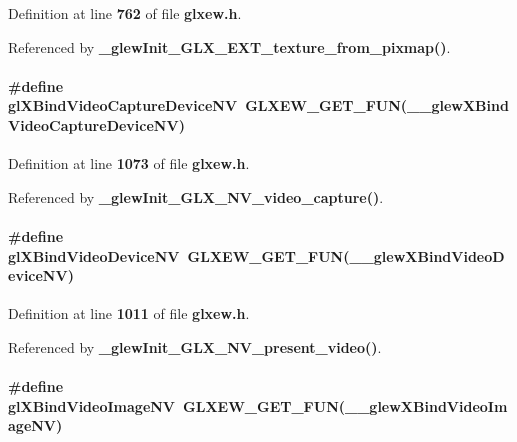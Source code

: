 Definition at line {\bf 762} of file {\bf glxew.\+h}.



Referenced by {\bf \+\_\+glew\+Init\+\_\+\+G\+L\+X\+\_\+\+E\+X\+T\+\_\+texture\+\_\+from\+\_\+pixmap()}.

\paragraph[{gl\+X\+Bind\+Video\+Capture\+Device\+NV}]{\setlength{\rightskip}{0pt plus 5cm}\#define gl\+X\+Bind\+Video\+Capture\+Device\+NV~{\bf G\+L\+X\+E\+W\+\_\+\+G\+E\+T\+\_\+\+F\+UN}({\bf \+\_\+\+\_\+glew\+X\+Bind\+Video\+Capture\+Device\+NV})}\label{glxew_8h_a60b29a266100d8d94ce4f84982b6f4ac}


Definition at line {\bf 1073} of file {\bf glxew.\+h}.



Referenced by {\bf \+\_\+glew\+Init\+\_\+\+G\+L\+X\+\_\+\+N\+V\+\_\+video\+\_\+capture()}.

\paragraph[{gl\+X\+Bind\+Video\+Device\+NV}]{\setlength{\rightskip}{0pt plus 5cm}\#define gl\+X\+Bind\+Video\+Device\+NV~{\bf G\+L\+X\+E\+W\+\_\+\+G\+E\+T\+\_\+\+F\+UN}({\bf \+\_\+\+\_\+glew\+X\+Bind\+Video\+Device\+NV})}\label{glxew_8h_a8caa8282c83c5fab88bc187d68df07a1}


Definition at line {\bf 1011} of file {\bf glxew.\+h}.



Referenced by {\bf \+\_\+glew\+Init\+\_\+\+G\+L\+X\+\_\+\+N\+V\+\_\+present\+\_\+video()}.

\paragraph[{gl\+X\+Bind\+Video\+Image\+NV}]{\setlength{\rightskip}{0pt plus 5cm}\#define gl\+X\+Bind\+Video\+Image\+NV~{\bf G\+L\+X\+E\+W\+\_\+\+G\+E\+T\+\_\+\+F\+UN}({\bf \+\_\+\+\_\+glew\+X\+Bind\+Video\+Image\+NV})}\label{glxew_8h_a31829bef0a134db174e5d03594856610}


